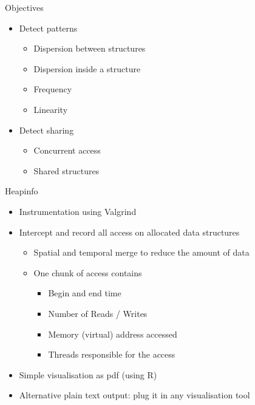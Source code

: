 \documentclass[xcolor={usenames,dvipsnames}]{beamer}
\begin{document}
\begin{frame}{Objectives}
    \begin{itemize}
        \item<1-> Detect patterns
            \begin{itemize}
                \item Dispersion between structures
                \item Dispersion inside a structure
                \item Frequency
                \item Linearity
            \end{itemize}
        \item<2-> Detect sharing
            \begin{itemize}
                \item Concurrent access
                \item Shared structures
            \end{itemize}
    \end{itemize}
\end{frame}

\begin{frame}{Heapinfo \cite{Beniamine13Cartographier}}
    \begin{itemize}
        \item<1-> Instrumentation using Valgrind
        \item<2-> Intercept and record all access on allocated data structures
            \begin{itemize}
                \item Spatial and temporal merge to reduce the amount of data
                \item One chunk of access contains
                    \begin{itemize}
                        \item Begin and end time
                        \item Number of Reads / Writes
                        \item Memory (virtual) address accessed
                        \item Threads responsible for the access
                    \end{itemize}
            \end{itemize}
        \item<3-> Simple visualisation as pdf (using R)
        \item<4-> Alternative plain text output: plug it in any visualisation tool
    \end{itemize}
\end{frame}
\end{document}
